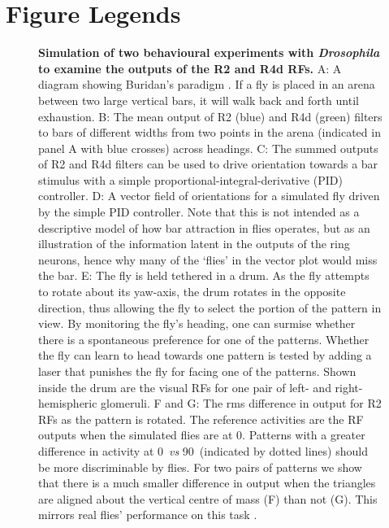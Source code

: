 \section*{Figure Legends}
%
\begin{figure}[htp]
	\caption{
		{\bf Simulation of two behavioural experiments with \emph{Drosophila} to examine the outputs of the R2 and R4d \acp{RF}.}
		A: A diagram showing Buridan's paradigm \protect\cite{Gotz1980,Bulthoff1982}. If a fly is placed in an arena between two large vertical bars, it will walk back and forth until exhaustion.
		B: The mean output of R2 (blue) and R4d (green) filters to bars of different widths from two points in the arena (indicated in panel A with blue crosses) across headings.
		C: The summed outputs of R2 and R4d filters can be used to drive orientation towards a bar stimulus with a simple
		proportional-integral-derivative (PID) controller.
		D: A vector field of orientations for a simulated fly driven by the simple PID controller.
		Note that this is not intended as a descriptive model of how bar attraction in flies operates, but as an illustration of the information latent in the outputs of the ring neurons, hence why many of the `flies' in the vector plot would miss the bar.
		E: The fly is held tethered in a drum. As the fly attempts to rotate about its yaw-axis, the drum rotates in the opposite direction, thus allowing the fly to select the portion of the pattern in view.
		By monitoring the fly's heading, one can surmise whether there is a spontaneous preference for one of the patterns.
		Whether the fly can learn to head towards one pattern is tested by adding a laser that punishes the fly for facing one of the patterns.
		Shown inside the drum are the visual \acp{RF} for one pair of left- and right-hemispheric glomeruli.
		F and G: The \ac{rms} difference in output for R2 \acp{RF} as the pattern is rotated.
		The reference activities are the \ac{RF} outputs when the simulated flies are at 0\degree.
		Patterns with a greater difference in activity at 0\degree\ \emph{vs} 90\degree\ (indicated by dotted lines) should be more discriminable by flies.
		For two pairs of patterns we show that there is a much smaller difference in output when the triangles are aligned about the vertical centre of mass (F) than not (G).
		This mirrors real flies' performance on this task \cite{Ernst1999}.
	}
	\label{fig:recap}
\end{figure}

